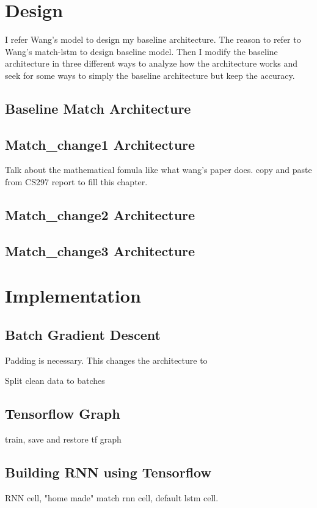 \documentclass[modernstyle,12pt]{sjsuthesis}
\theoremstyle{definition}
\begin{document}
\chapter{Design}
I refer Wang's model to design my baseline architecture. The reason to refer to Wang's match-lstm to design baseline model. Then I modify the baseline architecture in three different ways to analyze how the architecture works and seek for some ways to simply the baseline architecture but keep the accuracy.

\section{Baseline Match Architecture}

\section{Match\_change1 Architecture}
Talk about the mathematical fomula like what wang's paper does. copy and paste from CS297 report to fill this chapter.
\section{Match\_change2 Architecture}

\section{Match\_change3 Architecture}

\chapter{Implementation}
\section{Batch Gradient Descent}

Padding is necessary. This changes the architecture to

Split clean data to batches

\section{Tensorflow Graph}
train, save and restore tf graph

\section{Building RNN using Tensorflow}
RNN cell, "home made" match rnn cell, default lstm cell.
\end{document}
